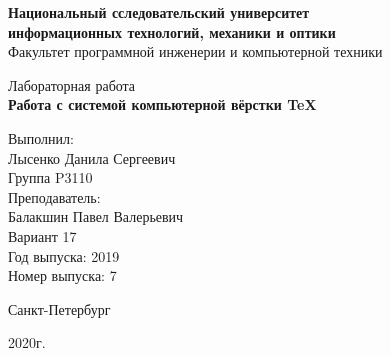 \thispagestyle{empty}
\begin{center}
    {\bfseries Национальный сследовательский университет \\
    информационных технологий, механики и оптики}\\
    Факультет программной инженерии и компьютерной техники

    \vspace{20em}

    {\large Лабораторная работа }\\
    {\Large \textbf{Работа с системой компьютерной вёрстки \TeX}}
\end{center}

\vspace{15em}

\begin{flushright}
    Выполнил:\\
    Лысенко Данила Сергеевич\\
    Группа P3110\\
    Преподаватель:\\
    Балакшин Павел Валерьевич\\
    Вариант 17\\
    Год выпуска: 2019\\
    Номер выпуска: 7
\end{flushright}

\vspace{\fill}

\begin{center}
Санкт-Петербург

2020г.
\end{center}